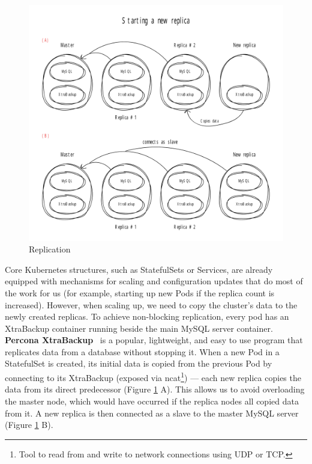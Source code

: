 \begin{figure}[!ht]
    \centering
    \includegraphics[width=1\textwidth, angle=0]{img/replication.pdf}
    \caption{Replication}
    \label{fig:replication}
\end{figure}

Core Kubernetes structures, such as StatefulSets or Services, are already equipped with mechanisms
for scaling and configuration updates that do most of the work for us (for example, starting up new
Pods if the replica count is increased). However, when scaling up, we need to copy the cluster’s
data to the newly created replicas. To achieve non-blocking replication, every pod has an XtraBackup
container running beside the main MySQL server container. \textbf{Percona XtraBackup}~\cite{percona}
is a popular, lightweight, and easy to use program that replicates data from a database without
stopping it. When a new Pod in a StatefulSet is created, its initial data is copied from the
previous Pod by connecting to its XtraBackup (exposed via ncat\footnote{Tool to read from and
write to network connections using UDP or TCP.}) --- each new replica copies the data from its direct
predecessor (Figure \ref{fig:replication} A). This allows us to avoid overloading the master node,
which would have occurred if the replica nodes all copied data from it. A new replica is then connected
as a slave to the master MySQL server (Figure \ref{fig:replication} B).

